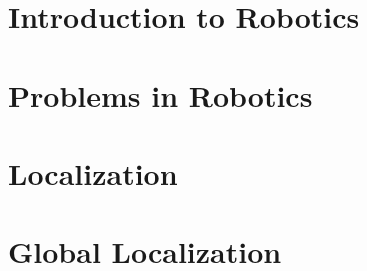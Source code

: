 

\section{Introduction to Robotics}
\label{sec:robo-intro}

\section{Problems in Robotics}
\label{sec:robo-problems}

\section{Localization}
\label{sec:robo-local}

\section{Global Localization}
\label{sec:robo-global}

